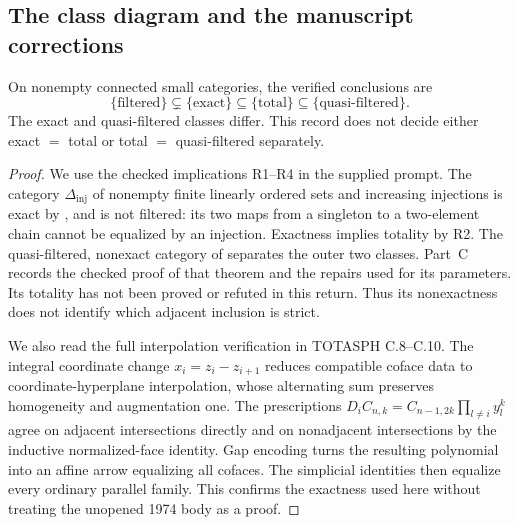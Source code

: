 \subsection{The class diagram and the manuscript corrections}
\label{subsec:manuscript-audit}

\begin{proposition}
\label{D:class-diagram}
On nonempty connected small categories, the verified conclusions are
\[
 \{\text{filtered}\}\subsetneq\{\text{exact}\}
 \subseteq\{\text{total}\}\subseteq\{\text{quasi-filtered}\}.
\]
The exact and quasi-filtered classes differ. This record does not decide
either exact $=$ total or total $=$ quasi-filtered separately.
\end{proposition}
\begin{proof}
We use the checked implications R1--R4 in the supplied prompt. The
category $\Delta_{\mathrm{inj}}$ of nonempty finite linearly ordered
sets and increasing injections is exact by
\citet[Theorem~3]{IsbellMitchell1973}, and is not filtered: its two
maps from a singleton to a two-element chain cannot be equalized by
an injection. Exactness implies totality by R2. The quasi-filtered,
nonexact category of \citet[Construction~C.1 and Theorem~C.2]{AdamekKoubekReiterman1981}
separates the outer two classes. Part~C records the checked proof of
that theorem and the repairs used for its parameters. Its totality
has not been proved or refuted in this return. Thus its nonexactness
does not identify which adjacent inclusion is strict.

We also read the full interpolation verification in TOTASPH C.8--C.10.
The integral coordinate change $x_i=z_i-z_{i+1}$ reduces compatible
coface data to coordinate-hyperplane interpolation, whose alternating
sum preserves homogeneity and augmentation one. The prescriptions
$D_iC_{n,k}=C_{n-1,2k}\prod_{l\ne i}y_l^k$ agree on adjacent
intersections directly and on nonadjacent intersections by the
inductive normalized-face identity. Gap encoding turns the resulting
polynomial into an affine arrow equalizing all cofaces. The simplicial
identities then equalize every ordinary parallel family. This confirms
the exactness used here without treating the unopened 1974 body as a proof.


\end{proof}
